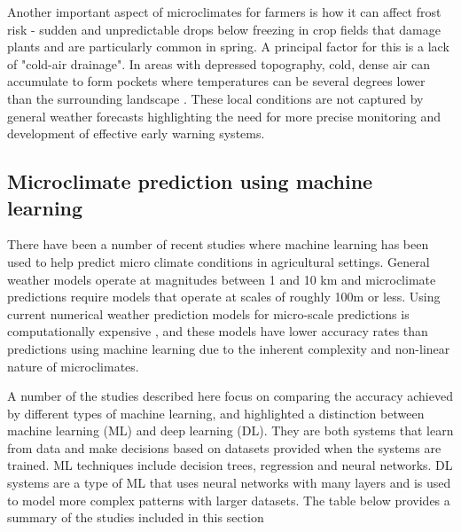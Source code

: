 Another important aspect of microclimates for farmers is how it can affect frost
risk - sudden and unpredictable drops below freezing in crop fields that damage
plants and are particularly common in spring. A principal factor for this is a
lack of "cold-air drainage". In areas with depressed topography, cold, dense air
can accumulate to form pockets where temperatures can be several degrees lower
than the surrounding landscape \cite{drepper2022}. These local conditions are
not captured by general weather forecasts highlighting the need for more precise
monitoring and development of effective early warning systems.

\subsection{Microclimate prediction using machine learning}

There have been a number of recent studies where machine learning has been used
to help predict micro climate conditions in agricultural settings. General
weather models operate at magnitudes between 1 and 10 km and microclimate
predictions require models that operate at scales of roughly 100m or less. Using
current numerical weather prediction models for micro-scale predictions is
computationally expensive \cite{blunn2024machine}, and these models have lower
accuracy rates than predictions using machine learning due to the inherent
complexity and non-linear nature of microclimates.

A number of the studies described here focus on comparing the accuracy achieved
by different types of machine learning, and highlighted a distinction between
machine learning (ML) and deep learning (DL).  They are both systems that learn
from data and make decisions based on datasets provided when the systems are
trained.  ML techniques include decision trees, regression and neural networks.
DL systems are a type of ML that uses neural networks with many layers and is
used to model more complex patterns with larger datasets. The table below
provides a summary of the studies included in this section


